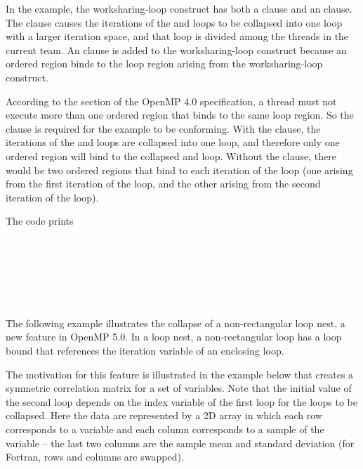 In the example, the worksharing-loop construct has both a  clause and an  
clause. The  clause causes the iterations of the  and 
 loops to be collapsed into one loop with a larger iteration space, and 
that loop is divided among the threads in the current team. An  
clause is added to the worksharing-loop construct because an ordered region binds to the loop 
region arising from the worksharing-loop construct.

According to the  section of the OpenMP 4.0 specification, 
a thread must not execute more than one ordered region that binds 
to the same loop region. So the  clause is required for the example 
to be conforming. With the  clause, the iterations of the  
and  loops are collapsed into one loop, and therefore only one ordered 
region will bind to the collapsed  and  loop. Without the  
clause, there would be two ordered regions that bind to each iteration of the  
loop (one arising from the first iteration of the  loop, and the other 
arising from the second iteration of the  loop).

\pagebreak
The code prints

\\
\\
\\
\\
\\




The following example illustrates the collapse of a non-rectangular loop nest,
a new feature in OpenMP 5.0. In a loop nest, a non-rectangular loop has a
loop bound that references the iteration variable of an enclosing loop.

The motivation for this feature is illustrated
in the example below that creates a symmetric correlation matrix for a set of
variables. Note that the initial value of the second loop depends on the index
variable of the first loop for the loops to be collapsed.
Here the data are represented by a 2D array in which each row corresponds to a variable
and each column corresponds to a sample of the variable -- the last two columns
are the sample mean and standard deviation (for Fortran, rows and columns are swapped).


